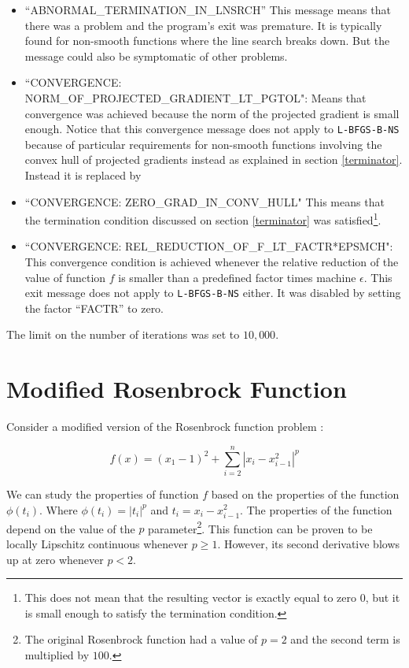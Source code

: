 \begin{itemize}

\item ``ABNORMAL\_TERMINATION\_IN\_LNSRCH'' This message means that there was a problem and the program's exit was premature. It is typically found for non-smooth functions where the line search breaks down. But the message could also be symptomatic of other problems.

\item ``CONVERGENCE: NORM\_OF\_PROJECTED\_GRADIENT\_LT\_PGTOL": Means that convergence was achieved because the norm of the projected gradient is small enough. Notice that this convergence message does not apply to \texttt{L-BFGS-B-NS} because of particular requirements for non-smooth functions involving the convex hull of projected gradients instead as explained in section \ref{terminator}. Instead it is replaced by

\item ``CONVERGENCE: ZERO\_GRAD\_IN\_CONV\_HULL" This means that the termination condition discussed on section \ref{terminator} was satisfied\footnote{This does not mean that the resulting vector is exactly equal to zero $0$, but it is small enough to satisfy the termination condition.}.

\item ``CONVERGENCE: REL\_REDUCTION\_OF\_F\_LT\_FACTR*EPSMCH": This convergence condition is achieved whenever the relative reduction of the value of function $f$ is smaller than a predefined factor times machine $\epsilon$. This exit message does not apply to \texttt{L-BFGS-B-NS} either. It was disabled by setting the factor ``FACTR'' to zero.

\end{itemize}

The limit on the number of iterations was set to $10,000$.

\section{Modified Rosenbrock Function} \label{ros}

Consider a modified version of the Rosenbrock function problem \citep{rosenbrock}:

\begin{equation} \label{modifiedrosenbrock}
    f(x) = (x_1 - 1)^2 + \sum_{i = 2}^n |x_i - x_{i - 1}^2|^p
\end{equation}

We can study the properties of function $f$ based on the properties of the function $\phi(t_i)$. Where $\phi(t_i) = |t_i|^p$ and $t_i = x_i - x_{i - 1}^2$. The properties of the function depend on the value of the $p$ parameter\footnote{The original Rosenbrock function had a value of $p = 2$ and the second term is multiplied by $100$.}. This function can be proven to be locally Lipschitz continuous whenever $p \geq 1$. However, its second derivative blows up at zero whenever $p < 2$.

